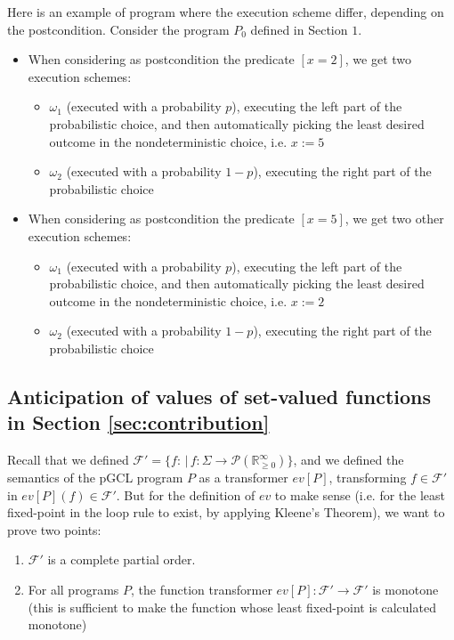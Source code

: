 \documentclass[a4paper,10pt]{llncs}
\def\RRposi {{\mathbb R_{\geq 0}^{\infty}}}
\begin{document}
\begin{example}
\label{ex:diff_ex_sch}
Here is an example of program where the execution scheme differ, depending on the postcondition.
Consider the program $P_0$ defined in Section $1$.
\begin{itemize}
\item When considering as postcondition the predicate $[x = 2]$, we get two execution schemes:
\begin{itemize}
\item $\omega_1$ (executed with a probability $p$), executing the left part of the probabilistic choice, and then automatically picking the least desired outcome in the nondeterministic choice, i.e. $x := 5$
\item $\omega_2$ (executed with a probability $1-p$), executing the right part of the probabilistic choice
\end{itemize}
\item When considering as postcondition the predicate $[x = 5]$, we get two other execution schemes:
\begin{itemize}
\item $\omega_1$ (executed with a probability $p$), executing the left part of the probabilistic choice, and then automatically picking the least desired outcome in the nondeterministic choice, i.e. $x := 2$
\item $\omega_2$ (executed with a probability $1-p$), executing the right part of the probabilistic choice
\end{itemize}
\end{itemize}
\end{example}

\subsection{Anticipation of values of set-valued functions in Section \ref{sec:contribution}}
Recall that we defined $\mathcal{F}' = \{f : \,|\, f : \Sigma \rightarrow \mathcal{P}(\RRposi) \}$, and we defined the semantics of the pGCL program $P$ as a transformer $ev[P]$, transforming $f \in \mathcal{F'}$ in $ev[P](f) \in \mathcal{F}'$. But for the definition of $ev$ to make sense (i.e. for the least fixed-point in the loop rule to exist, by applying Kleene's Theorem), we want to prove two points:
\begin{enumerate}
\item $\mathcal{F}'$ is a complete partial order.
\item For all programs $P$, the function transformer $ev[P] : \mathcal{F}' \rightarrow \mathcal{F}'$ is monotone (this is sufficient to make the function whose least fixed-point is calculated monotone)
\end{enumerate}
\bigskip
\end{document}
